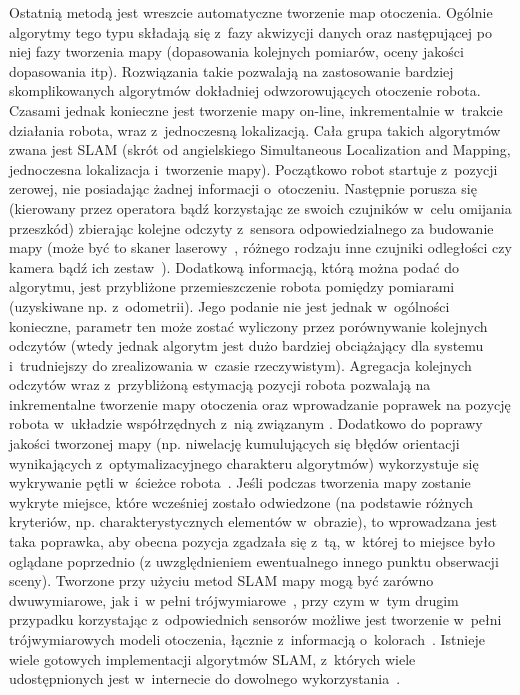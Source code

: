 Ostatnią metodą jest wreszcie automatyczne tworzenie map otoczenia. Ogólnie
algorytmy tego typu składają się z~fazy akwizycji danych oraz następującej
po niej fazy tworzenia mapy (dopasowania kolejnych pomiarów, oceny jakości
dopasowania itp). Rozwiązania takie pozwalają na zastosowanie bardziej skomplikowanych
algorytmów dokładniej odwzorowujących otoczenie robota. Czasami jednak konieczne
jest tworzenie mapy on-line, inkrementalnie w~trakcie działania robota,
wraz z~jednoczesną lokalizacją. Cała grupa takich algorytmów zwana jest SLAM
(skrót od angielskiego Simultaneous Localization and Mapping, jednoczesna
lokalizacja i~tworzenie mapy). Początkowo robot startuje z~pozycji zerowej,
nie posiadając żadnej informacji o~otoczeniu. Następnie porusza się (kierowany przez
operatora bądź korzystając ze swoich czujników w~celu omijania przeszkód) zbierając
kolejne odczyty z~sensora odpowiedzialnego za budowanie mapy (może być to skaner laserowy~\cite{laser_slam},
różnego rodzaju inne czujniki odległości czy kamera bądź ich zestaw~\cite{vslam}). Dodatkową
informacją, którą można podać do algorytmu, jest przybliżone przemieszczenie robota
pomiędzy pomiarami (uzyskiwane np. z~odometrii). Jego podanie nie jest jednak w~ogólności
konieczne, parametr ten może zostać wyliczony przez porównywanie kolejnych odczytów
(wtedy jednak algorytm jest dużo bardziej obciążający dla systemu i~trudniejszy do zrealizowania
w~czasie rzeczywistym). Agregacja kolejnych odczytów wraz z~przybliżoną estymacją
pozycji robota pozwalają na inkrementalne tworzenie mapy otoczenia oraz wprowadzanie
poprawek na pozycję robota w~układzie współrzędnych z~nią związanym \cite{Dissanayake01asolution}.
Dodatkowo do poprawy jakości tworzonej mapy (np. niwelację kumulujących się błędów orientacji
wynikających z~optymalizacyjnego charakteru algorytmów) wykorzystuje się wykrywanie pętli
w~ścieżce robota~\cite{slam-loop}. Jeśli podczas tworzenia mapy zostanie wykryte
miejsce, które wcześniej zostało odwiedzone (na podstawie różnych kryteriów, np. charakterystycznych
elementów w~obrazie), to wprowadzana jest taka poprawka, aby obecna pozycja zgadzała się
z~tą, w~której to miejsce było oglądane poprzednio (z uwzględnieniem ewentualnego
innego punktu obserwacji sceny). Tworzone przy użyciu metod SLAM mapy mogą być zarówno
dwuwymiarowe, jak i~w pełni trójwymiarowe~\cite{6dslam}, przy czym w~tym drugim przypadku
korzystając z~odpowiednich sensorów możliwe jest tworzenie w~pełni trójwymiarowych
modeli otoczenia, łącznie z~informacją o~kolorach~\cite{kinect_slam}.
Istnieje wiele gotowych implementacji algorytmów SLAM, z~których wiele udostępnionych
jest w~internecie do dowolnego wykorzystania~\cite{openslam}.

